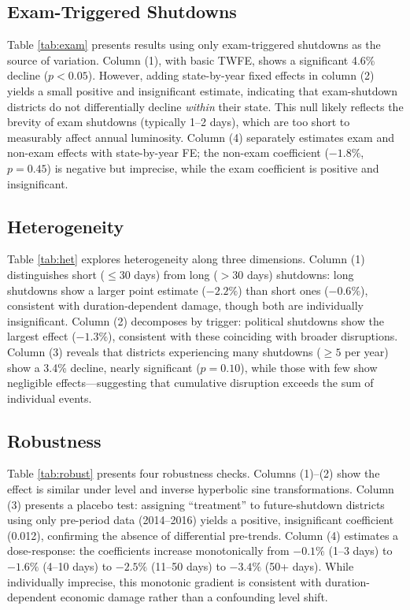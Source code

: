 \documentclass[12pt]{article}
\begin{document}
\subsection{Exam-Triggered Shutdowns}



Table \ref{tab:exam} presents results using only exam-triggered shutdowns as the source of variation. Column (1), with basic TWFE, shows a significant 4.6\% decline ($p < 0.05$). However, adding state-by-year fixed effects in column (2) yields a small positive and insignificant estimate, indicating that exam-shutdown districts do not differentially decline \emph{within} their state. This null likely reflects the brevity of exam shutdowns (typically 1--2 days), which are too short to measurably affect annual luminosity. Column (4) separately estimates exam and non-exam effects with state-by-year FE; the non-exam coefficient ($-1.8\%$, $p = 0.45$) is negative but imprecise, while the exam coefficient is positive and insignificant.

\subsection{Heterogeneity}



Table \ref{tab:het} explores heterogeneity along three dimensions. Column (1) distinguishes short ($\leq 30$ days) from long ($> 30$ days) shutdowns: long shutdowns show a larger point estimate ($-2.2\%$) than short ones ($-0.6\%$), consistent with duration-dependent damage, though both are individually insignificant. Column (2) decomposes by trigger: political shutdowns show the largest effect ($-1.3\%$), consistent with these coinciding with broader disruptions. Column (3) reveals that districts experiencing many shutdowns ($\geq 5$ per year) show a 3.4\% decline, nearly significant ($p = 0.10$), while those with few show negligible effects---suggesting that cumulative disruption exceeds the sum of individual events.

\subsection{Robustness}



Table \ref{tab:robust} presents four robustness checks. Columns (1)--(2) show the effect is similar under level and inverse hyperbolic sine transformations. Column (3) presents a placebo test: assigning ``treatment'' to future-shutdown districts using only pre-period data (2014--2016) yields a positive, insignificant coefficient (0.012), confirming the absence of differential pre-trends. Column (4) estimates a dose-response: the coefficients increase monotonically from $-0.1\%$ (1--3 days) to $-1.6\%$ (4--10 days) to $-2.5\%$ (11--50 days) to $-3.4\%$ (50+ days). While individually imprecise, this monotonic gradient is consistent with duration-dependent economic damage rather than a confounding level shift.
\end{document}
